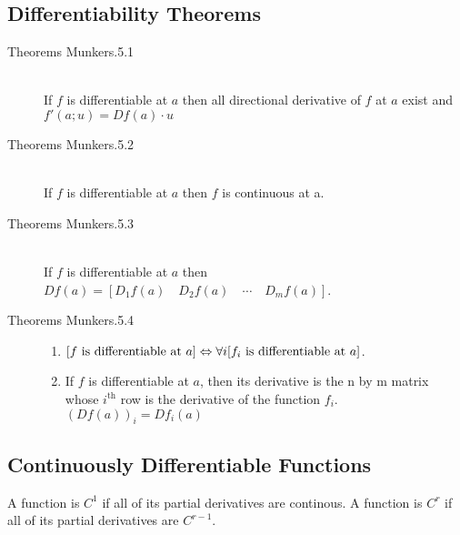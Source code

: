 \subsection{Differentiability Theorems}
\begin{description}
	\item[Theorems Munkers.5.1] \hfill \\
		If $f$ is differentiable at $a$ then all directional
		derivative of $f$ at $a$ exist and
		$f'(a;u)=Df(a)\cdot u$

	\item[Theorems Munkers.5.2] \hfill \\
		If $f$ is differentiable at $a$ then $f$ is continuous at a.

	\item[Theorems Munkers.5.3] \hfill \\
		If $f$ is differentiable at $a$
		then\\ $Df(a)=[D_1f(a) \quad D_2f(a) \quad \cdots \quad D_mf(a)]$.

	\item[Theorems Munkers.5.4] \hfill
	\begin{enumerate}
		\renewcommand{\labelenumi}{\alph{enumi}.}
		\item
		$[f \textrm{ is differentiable at } a ]\\
			\Leftrightarrow
			\forall i [f_i \textrm{ is differentiable at } a]$.

		\item
		If $f$ is differentiable at $a$, then its derivative is the n by m
		matrix whose $i^\textrm{th}$ row is the derivative of the function $f_i$. $(Df(a))_{i} = Df_i(a)$
	\end{enumerate}
\end{description}

\subsection{Continuously Differentiable Functions}

A function is $C^1$ if all of its partial derivatives are continous.
A function is $C^r$ if all of its partial derivatives are $C^{r-1}$.

